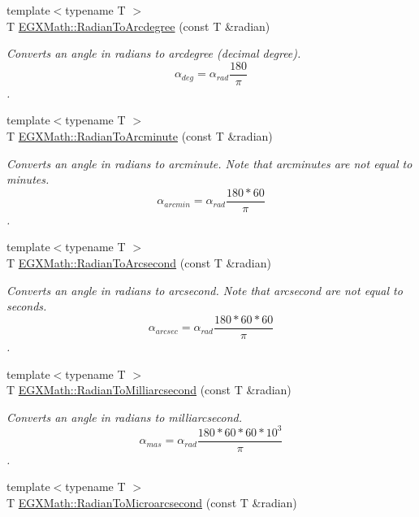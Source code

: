 \begin{DoxyCompactItemize}
{\footnotesize template$<$typename T $>$ }\\T \mbox{\hyperlink{group___e_g_x_math-_angle_conversions-_radian_ga3dfdc97357cc07f8379976bbc08f9852}{E\+G\+X\+Math\+::\+Radian\+To\+Arcdegree}} (const T \&radian)
\begin{DoxyCompactList}\small\item\em Converts an angle in radians to arcdegree (decimal degree). \[\alpha_{deg}=\alpha_{rad}\frac{180}{\pi}\]. \end{DoxyCompactList}\item 
{\footnotesize template$<$typename T $>$ }\\T \mbox{\hyperlink{group___e_g_x_math-_angle_conversions-_radian_ga722e3b8e78540a6b3942b73b64aeb8d2}{E\+G\+X\+Math\+::\+Radian\+To\+Arcminute}} (const T \&radian)
\begin{DoxyCompactList}\small\item\em Converts an angle in radians to arcminute. Note that arcminutes are not equal to minutes. \[\alpha_{arcmin}=\alpha_{rad}\frac{180 * 60}{\pi}\]. \end{DoxyCompactList}\item 
{\footnotesize template$<$typename T $>$ }\\T \mbox{\hyperlink{group___e_g_x_math-_angle_conversions-_radian_ga2f952f6675a0fc54bf72bfe4e3d2664a}{E\+G\+X\+Math\+::\+Radian\+To\+Arcsecond}} (const T \&radian)
\begin{DoxyCompactList}\small\item\em Converts an angle in radians to arcsecond. Note that arcsecond are not equal to seconds. \[\alpha_{arcsec}=\alpha_{rad}\frac{180 * 60 * 60}{\pi}\]. \end{DoxyCompactList}\item 
{\footnotesize template$<$typename T $>$ }\\T \mbox{\hyperlink{group___e_g_x_math-_angle_conversions-_radian_ga84fbb494a455cfeb30be62776f96c9a9}{E\+G\+X\+Math\+::\+Radian\+To\+Milliarcsecond}} (const T \&radian)
\begin{DoxyCompactList}\small\item\em Converts an angle in radians to milliarcsecond. \[\alpha_{mas}=\alpha_{rad}\frac{180 * 60 * 60 * 10^3}{\pi}\]. \end{DoxyCompactList}\item 
{\footnotesize template$<$typename T $>$ }\\T \mbox{\hyperlink{group___e_g_x_math-_angle_conversions-_radian_ga3a515ca2838a305fa40750763f546a86}{E\+G\+X\+Math\+::\+Radian\+To\+Microarcsecond}} (const T \&radian)

\end{DoxyCompactItemize}
